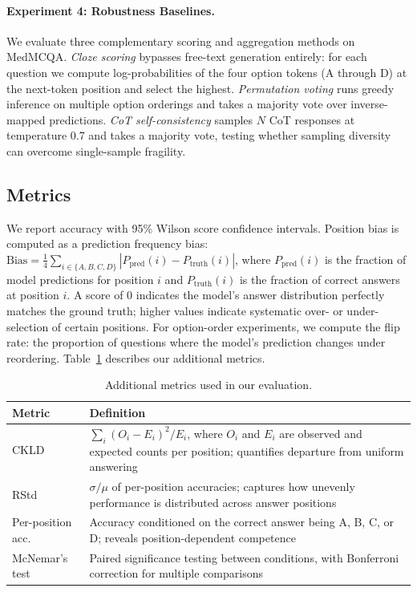 \documentclass[runningheads,a4paper]{llncs}
\begin{document}
\paragraph{Experiment 4: Robustness Baselines.}
We evaluate three complementary scoring and aggregation methods on MedMCQA. \textit{Cloze scoring} bypasses free-text generation entirely: for each question we compute log-probabilities of the four option tokens (A through D) at the next-token position and select the highest. \textit{Permutation voting} runs greedy inference on multiple option orderings and takes a majority vote over inverse-mapped predictions. \textit{CoT self-consistency} samples $N$ CoT responses at temperature 0.7 and takes a majority vote, testing whether sampling diversity can overcome single-sample fragility.

\subsection{Metrics}

We report accuracy with 95\% Wilson score confidence intervals. Position bias is computed as a prediction frequency bias: $\text{Bias} = \frac{1}{4} \sum_{i \in \{A,B,C,D\}} |P_{\text{pred}}(i) - P_{\text{truth}}(i)|$, where $P_{\text{pred}}(i)$ is the fraction of model predictions for position $i$ and $P_{\text{truth}}(i)$ is the fraction of correct answers at position $i$. A score of 0 indicates the model's answer distribution perfectly matches the ground truth; higher values indicate systematic over- or under-selection of certain positions. For option-order experiments, we compute the flip rate: the proportion of questions where the model's prediction changes under reordering. Table~\ref{tab:metrics_summary} describes our additional metrics.

\begin{table}[t]
\centering
\caption{Additional metrics used in our evaluation.}
\label{tab:metrics_summary}
\begin{tabular}{lp{7.2cm}}
\toprule
\textbf{Metric} & \textbf{Definition} \\
\midrule
CKLD & $\sum_i (O_i - E_i)^2 / E_i$, where $O_i$ and $E_i$ are observed and expected counts per position; quantifies departure from uniform answering \\
RStd & $\sigma / \mu$ of per-position accuracies; captures how unevenly performance is distributed across answer positions \\
Per-position acc. & Accuracy conditioned on the correct answer being A, B, C, or D; reveals position-dependent competence \\
McNemar's test & Paired significance testing between conditions, with Bonferroni correction for multiple comparisons \\
\bottomrule
\end{tabular}
\end{table}
\end{document}
